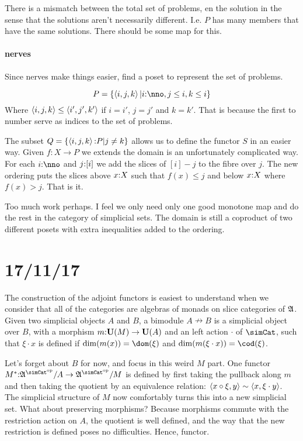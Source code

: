 \documentclass[csh.tex]{subfiles}
\begin{document}
There is a mismatch between the total set of problems, en the solution in the sense that the solutions aren't necessarily different. I.e. $P$ has many members that have the same solutions. There should be some map for this.

\paragraph{nerves}
Since nerves make things easier, find a poset to represent the set of problems.

\[ P = \set{\tuplet{i,j,k}|i\of\nno,j\leq i, k\leq i}\]
Where $\left\langle i,j,k \right\rangle\leq \left\langle i',j',k' \right\rangle$ if $i=i'$, $j=j'$ and $k=k'$. That is because the first to number serve as indices to the set of problems.

The subset $Q = \left\{\left\langle i,j,k \right\rangle\mathord : P|j\neq k\right\}$ allows us to define the functor $S$ in an easier way. Given $f:X\to P$ we extends the domain is an unfortunately complicated way. For each $i\of\nno$ and $j\mathord :[i]$ we add the slices of $[i] - j$ to the fibre over $j$. The new ordering puts the slices above $x\mathord : X$ such that $f(x)\leq j$ and below $x\mathord : X$ where $f(x)>j$. That is it.

Too much work perhaps. I feel we only need only one good monotone map and do the rest in the category of simplicial sets. The domain is still a coproduct of two different posets with extra inequalities added to the ordering.


\section{17/11/17}
The construction of the adjoint functors is easiest to understand when we consider that all of the categories are algebras of monads on slice categories of $\mathfrak A$. Given two simplicial objects $A$ and $B$, a bimodule $A\nrightarrow B$ is a simplicial object over $B$, with a morphism $m\mathord :\mathbf{U}(M)\to \mathbf{U}(A)$ and an left action $\cdot$ of $\simCat$, such that $\xi\cdot x$ is defined if $\dim(m(x)) = \dom(\xi)$ and $\dim(m(\xi\cdot x)) = \cod(\xi)$.

Let's forget about $B$ for now, and focus in this weird $M$ part. One functor $M\ri\of \ambient\s/A\to\ambient\s/M$ is defined by first taking the pullback along $m$ and then taking the quotient by an equivalence relation: $\left\langle x\circ \xi , y \right\rangle\sim\left\langle x,\xi\cdot y \right\rangle$. The simplicial structure of $M$ now comfortably turns this into a new simplicial set. What about preserving morphisms? Because morphisms commute with the restriction action on $A$, the quotient is well defined, and the way that the new restriction is defined poses no difficulties. Hence, functor.
\end{document}
